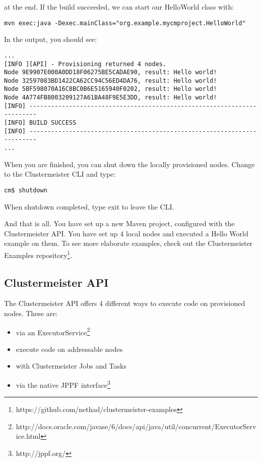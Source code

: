 \documentclass{article}
\begin{document}
at the end. If the build succeeded, we can start our HelloWorld class with:

\begin{lstlisting}[breaklines=true, backgroundcolor=\color{lbcolor}]
mvn exec:java -Dexec.mainClass="org.example.mycmproject.HelloWorld"
\end{lstlisting}

In the output, you should see:

\begin{lstlisting}[breaklines=true, backgroundcolor=\color{lbcolor}]
...
[INFO ][API] - Provisioning returned 4 nodes.
Node 9E9907E000A0DD18F06275BE5CADAE90, result: Hello world!
Node 32597083BD1422CA62CC94C56ED4DA76, result: Hello world!
Node 5BF598070A16C8BC0B6E5165940F0202, result: Hello world!
Node 4A774FB8003209127A61BA48F9E5E3DD, result: Hello world!
[INFO] ------------------------------------------------------------------------
[INFO] BUILD SUCCESS
[INFO] ------------------------------------------------------------------------
...
\end{lstlisting}

When you are finished, you can shut down the locally provisioned nodes. Change to the Clustermeister CLI and type:

\begin{lstlisting}[breaklines=true, backgroundcolor=\color{lbcolor}]
cm$ shutdown
\end{lstlisting}

When shutdown completed, type exit to leave the CLI.

And that is all. You have set up a new Maven project, configured with the Clustermeister API. You have set up 4 local nodes and executed a Hello World example on them. To see more elaborate examples, check out the Clustermeister Examples repository\footnote{https://github.com/nethad/clustermeister-examples}.

\subsection{Clustermeister API}

The Clustermeister API offers 4 different ways to execute code on provisioned nodes. These are:

\begin{itemize}
 \item via an ExecutorService\footnote{http://docs.oracle.com/javase/6/docs/api/java/util/concurrent/ExecutorService.html}
 \item execute code on addressable nodes
 \item with Clustermeister Jobs and Tasks
 \item via the native JPPF interface\footnote{http://jppf.org/}
\end{itemize}
\end{document}
